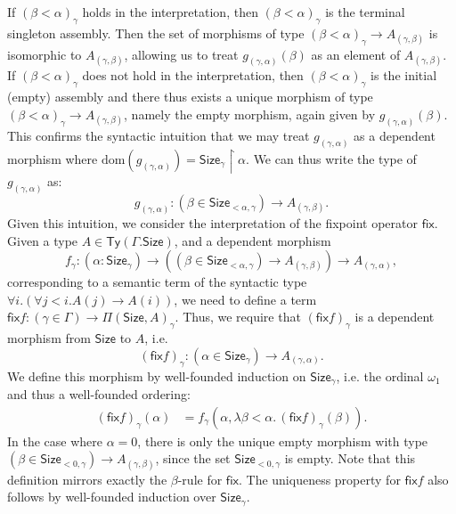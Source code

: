 \documentclass[10pt,a4paper]{article}
\theoremstyle{definition}
\theoremstyle{remark}
\renewcommand{\.}{.\,} %
\renewcommand{\:}{:} %
\newcommand{\Size}{\mathsf{Size}}
\newcommand{\fix}{\mathsf{fix}}
\newcommand{\0}{\mathbf{0}}
\newcommand{\1}{\mathbf{1}}
\newcommand\<\langle
\renewcommand\>\rangle
\newcommand{\dom}{\text{dom}}
\newcommand{\Ty}{\mathsf{Ty}}
\theoremstyle{remark}
\begin{document}
If $(\beta < \alpha)_\gamma $ holds in the interpretation, then $(\beta < \alpha)_\gamma$ is the terminal singleton assembly. Then the set of morphisms of type $(\beta < \alpha)_\gamma \to A_{(\gamma, \beta)}$ is isomorphic to $A_{(\gamma, \beta)}$, allowing us to treat $g_{(\gamma, \alpha)}(\beta)$ as an element of $A_{(\gamma, \beta)}$. 
If $(\beta < \alpha)_\gamma$ does not hold in the interpretation, then $(\beta < \alpha)_\gamma$ is the initial (empty) assembly and there thus exists a unique morphism of type $(\beta < \alpha)_\gamma \to A_{(\gamma, \beta)}$, namely the empty morphism, again given by $g_{(\gamma, \alpha)}(\beta)$. This confirms the syntactic intuition that we may treat $g_{(\gamma, \alpha)}$ as a dependent morphism where $\dom(g_{(\gamma, \alpha)}) = \Size_\gamma \upharpoonright \alpha$. We can thus write the type of $g_{(\gamma, \alpha)}$ as:
\[
g_{(\gamma, \alpha)} : (\beta \in \Size_{<\alpha, \gamma}) \to A_{(\gamma, \beta)}.
\]
Given this intuition, we consider the interpretation of the fixpoint operator $\fix$. Given a type $A \in \Ty(\Gamma. \Size)$, and a dependent morphism
\[
f_{\gamma} : (\alpha : \Size_\gamma) \to ((\beta \in \Size_{<\alpha, \gamma}) \to A_{(\gamma, \beta)}) \to A_{(\gamma, \alpha)},
\]
corresponding to a semantic term of the syntactic type $\forall i . (\forall j < i . A(j) \to A(i))$,
we need to define a term $\fix f : (\gamma \in \Gamma) \to \Pi (\Size, A)_\gamma$. Thus, we require that $(\fix f)_\gamma$ is a dependent morphism from $\Size$ to $A$, i.e. 
\[
(\fix f)_\gamma : (\alpha \in \Size_\gamma) \to A_{(\gamma, \alpha)}.
\] 
We define this morphism by well-founded induction on $\Size_\gamma$, i.e. the ordinal $\omega_1$ and thus a well-founded ordering:
\begin{align*}
	(\fix f)_\gamma(\alpha) &= f_\gamma(\alpha, \lambda \beta < \alpha \. (\fix f)_\gamma(\beta)).
\end{align*}
In the case where $\alpha = 0$, there is only the unique empty morphism with type $(\beta \in \Size_{<0, \gamma}) \to A_{(\gamma, \beta)}$, since the set $\Size_{<0, \gamma}$ is empty. 
Note that this definition mirrors exactly the $\beta$-rule for $\fix\!$. The uniqueness property for $\fix f$ also follows by well-founded induction over $\Size_\gamma$. 
\end{document}
